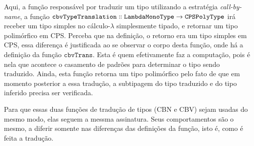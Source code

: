 
Aqui, a função responsável por traduzir um tipo utilizando a estratégia \textit{call-by-name}, a função $\mathtt{cbvTypeTranslation \dblcolon LambdaMonoType \to CPSPolyType}$ irá receber um tipo simples no cálculo-$\lambda$ simplesmente tipado, e retornar um tipo polimórfico em CPS.
Perceba que na definição, o retorno era um tipo simples em CPS, essa diferença é justificada ao se observar o corpo desta função, onde há a definição da função $\mathtt{cbvTrans}$.
Esta é quem efetivamente faz a computação, pois é nela que acontece o casamento de padrões para determinar o tipo sendo traduzido.
Ainda, esta função retorna um tipo polimórfico pelo fato de que em momento posterior a essa tradução, a subtipagem do tipo traduzido e do tipo inferido precisa ser verificada.


Para que essas duas funções de tradução de tipos (CBN e CBV) sejam usadas do mesmo modo, elas seguem a messma assinatura. 
Seus comportamentos são o mesmo, a diferir somente nas diferenças das definições da função, isto é, como é feita a tradução.

